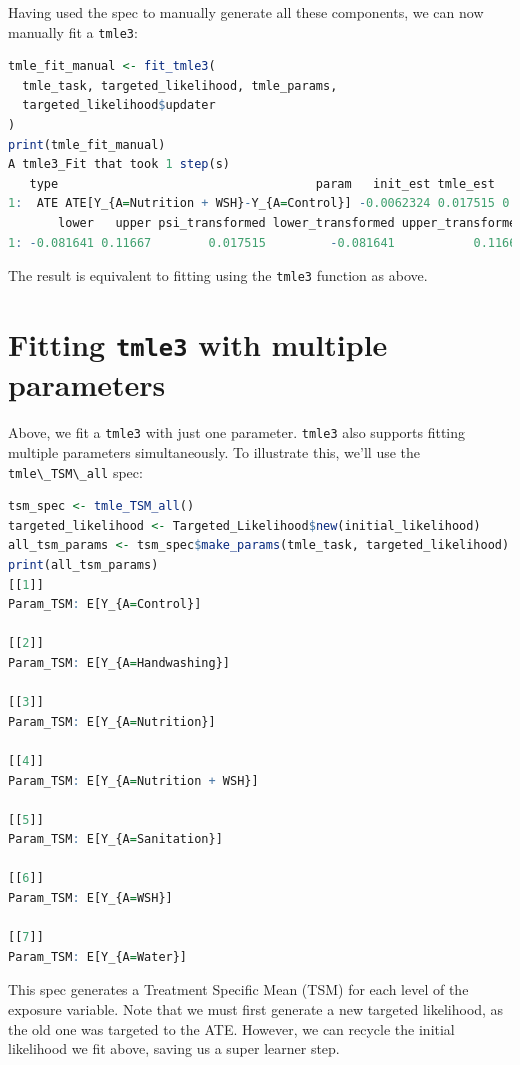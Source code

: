 \documentclass[12pt, krantz2,]{krantz}
\newcommand{\passthrough}[1]{#1}
\theoremstyle{definition}
\theoremstyle{definition}
\theoremstyle{definition}
\newcommand{\1}{\mathbbm{1}}
\begin{document}
Having used the spec to manually generate all these components, we can now
manually fit a \passthrough{\lstinline!tmle3!}:

\begin{lstlisting}[language=R]
tmle_fit_manual <- fit_tmle3(
  tmle_task, targeted_likelihood, tmle_params,
  targeted_likelihood$updater
)
print(tmle_fit_manual)
A tmle3_Fit that took 1 step(s)
   type                                    param   init_est tmle_est       se
1:  ATE ATE[Y_{A=Nutrition + WSH}-Y_{A=Control}] -0.0062324 0.017515 0.050591
       lower   upper psi_transformed lower_transformed upper_transformed
1: -0.081641 0.11667        0.017515         -0.081641           0.11667
\end{lstlisting}

The result is equivalent to fitting using the \passthrough{\lstinline!tmle3!} function as above.

\hypertarget{fitting-tmle3-with-multiple-parameters}{%
\section{\texorpdfstring{Fitting \texttt{tmle3} with multiple parameters}{Fitting tmle3 with multiple parameters}}\label{fitting-tmle3-with-multiple-parameters}}

Above, we fit a \passthrough{\lstinline!tmle3!} with just one parameter. \passthrough{\lstinline!tmle3!} also supports fitting
multiple parameters simultaneously. To illustrate this, we'll use the
\passthrough{\lstinline!tmle\_TSM\_all!} spec:

\begin{lstlisting}[language=R]
tsm_spec <- tmle_TSM_all()
targeted_likelihood <- Targeted_Likelihood$new(initial_likelihood)
all_tsm_params <- tsm_spec$make_params(tmle_task, targeted_likelihood)
print(all_tsm_params)
[[1]]
Param_TSM: E[Y_{A=Control}]

[[2]]
Param_TSM: E[Y_{A=Handwashing}]

[[3]]
Param_TSM: E[Y_{A=Nutrition}]

[[4]]
Param_TSM: E[Y_{A=Nutrition + WSH}]

[[5]]
Param_TSM: E[Y_{A=Sanitation}]

[[6]]
Param_TSM: E[Y_{A=WSH}]

[[7]]
Param_TSM: E[Y_{A=Water}]
\end{lstlisting}

This spec generates a Treatment Specific Mean (TSM) for each level of the
exposure variable. Note that we must first generate a new targeted likelihood,
as the old one was targeted to the ATE. However, we can recycle the initial
likelihood we fit above, saving us a super learner step.
\end{document}
